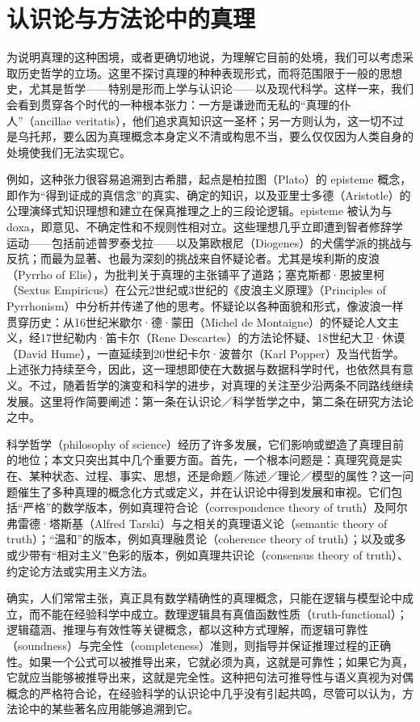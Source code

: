 \section{认识论与方法论中的真理}

为说明真理的这种困境，或者更确切地说，为理解它目前的处境，我们可以考虑采取历史哲学的立场。这里不探讨真理的种种表现形式，而将范围限于一般的思想史，尤其是哲学——特别是形而上学与认识论——以及现代科学。这样一来，我们会看到贯穿各个时代的一种根本张力：一方是谦逊而无私的“真理的仆人”（ancillae veritatis），他们追求真知识这一圣杯；另一方则认为，这一切不过是乌托邦，要么因为真理概念本身定义不清或构思不当，要么仅仅因为人类自身的处境使我们无法实现它。

例如，这种张力很容易追溯到古希腊，起点是柏拉图（Plato）的 episteme 概念，即作为“得到证成的真信念”的真实、确定的知识，以及亚里士多德（Aristotle）的公理演绎式知识理想和建立在保真推理之上的三段论逻辑。episteme 被认为与 doxa，即意见、不确定性和不规则性相对立。这些理想几乎立即遭到智者修辞学运动——包括前述普罗泰戈拉——以及第欧根尼（Diogenes）的犬儒学派的挑战与反抗；而最为显著、也最为深刻的挑战来自怀疑论者。尤其是埃利斯的皮浪（Pyrrho of Elis），为批判关于真理的主张铺平了道路；塞克斯都·恩披里柯（Sextus Empiricus）在公元2世纪或3世纪的《皮浪主义原理》（Principles of Pyrrhonism）中分析并传递了他的思考。怀疑论以各种面貌和形式，像波浪一样贯穿历史：从16世纪米歇尔·德·蒙田（Michel de Montaigne）的怀疑论人文主义，经17世纪勒内·笛卡尔（Rene Descartes）的方法论怀疑、18世纪大卫·休谟（David Hume），一直延续到20世纪卡尔·波普尔（Karl Popper）及当代哲学。上述张力持续至今，因此，这一理想即使在大数据与数据科学时代，也依然具有意义。不过，随着哲学的演变和科学的进步，对真理的关注至少沿两条不同路线继续发展。这里将作简要阐述：第一条在认识论／科学哲学之中，第二条在研究方法论之中。

科学哲学（philosophy of science）经历了许多发展，它们影响或塑造了真理目前的地位；本文只突出其中几个重要方面。首先，一个根本问题是：真理究竟是实在、某种状态、过程、事实、思想，还是命题／陈述／理论／模型的属性？这一问题催生了多种真理的概念化方式或定义，并在认识论中得到发展和审视。它们包括“严格”的数学版本，例如真理符合论（correspondence theory of truth）及阿尔弗雷德·塔斯基（Alfred Tarski）与之相关的真理语义论（semantic theory of truth）；“温和”的版本，例如真理融贯论（coherence theory of truth）；以及或多或少带有“相对主义”色彩的版本，例如真理共识论（consensus theory of truth）、约定论方法或实用主义方法。

确实，人们常常主张，真正具有数学精确性的真理概念，只能在逻辑与模型论中成立，而不能在经验科学中成立。数理逻辑具有真值函数性质（truth-functional）；逻辑蕴涵、推理与有效性等关键概念，都以这种方式理解，而逻辑可靠性（soundness）与完全性（completeness）准则，则指导并保证推理过程的正确性。如果一个公式可以被推导出来，它就必须为真，这就是可靠性；如果它为真，它就应当能够被推导出来，这就是完全性。这种把句法可推导性与语义真视为对偶概念的严格符合论，在经验科学的认识论中几乎没有引起共鸣，尽管可以认为，方法论中的某些著名应用能够追溯到它。

